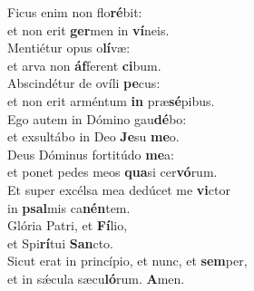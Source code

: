 \oddverse Ficus enim non flo\textbf{ré}bit:~\*\\
\oddverse et non erit \textbf{ger}men in \textbf{ví}neis.\\
\evenverse Mentiétur opus o\textbf{lí}væ:~\*\\
\evenverse et arva non \textbf{áf}ferent \textbf{ci}bum.\\
\oddverse Abscindétur de ovíli \textbf{pe}cus:~\*\\
\oddverse et non erit arméntum \textbf{in} præ\textbf{sé}pibus.\\
\evenverse Ego autem in Dómino gau\textbf{dé}bo:~\*\\
\evenverse et exsultábo in Deo \textbf{Je}su \textbf{me}o.\\
\oddverse Deus Dóminus fortitúdo \textbf{me}a:~\*\\
\oddverse et ponet pedes meos \textbf{qua}si cer\textbf{vó}rum.\\
\evenverse Et super excélsa mea dedúcet me \textbf{vi}ctor~\*\\
\evenverse in \textbf{psal}mis ca\textbf{nén}tem.\\
\oddverse Glória Patri, et \textbf{Fí}lio,~\*\\
\oddverse et Spi\textbf{rí}tui \textbf{San}cto.\\
\evenverse Sicut erat in princípio, et nunc, et \textbf{sem}per,~\*\\
\evenverse et in sǽcula sæcu\textbf{ló}rum. \textbf{A}men.\\
